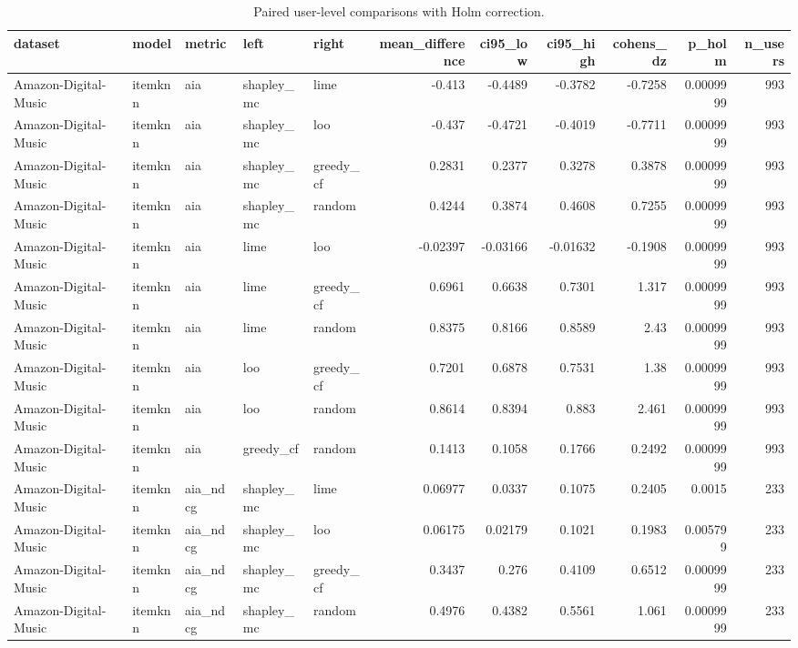 \begin{table}[t]\centering
\caption{Paired user-level comparisons with Holm correction.}\label{tab:paired-tests}
\begin{tabular}{lllllrrrrrr}
\toprule
dataset & model & metric & left & right & mean\_difference & ci95\_low & ci95\_high & cohens\_dz & p\_holm & n\_users \\
\midrule
Amazon-Digital-Music & itemknn & aia & shapley\_mc & lime & -0.413 & -0.4489 & -0.3782 & -0.7258 & 0.0009999 & 993 \\
Amazon-Digital-Music & itemknn & aia & shapley\_mc & loo & -0.437 & -0.4721 & -0.4019 & -0.7711 & 0.0009999 & 993 \\
Amazon-Digital-Music & itemknn & aia & shapley\_mc & greedy\_cf & 0.2831 & 0.2377 & 0.3278 & 0.3878 & 0.0009999 & 993 \\
Amazon-Digital-Music & itemknn & aia & shapley\_mc & random & 0.4244 & 0.3874 & 0.4608 & 0.7255 & 0.0009999 & 993 \\
Amazon-Digital-Music & itemknn & aia & lime & loo & -0.02397 & -0.03166 & -0.01632 & -0.1908 & 0.0009999 & 993 \\
Amazon-Digital-Music & itemknn & aia & lime & greedy\_cf & 0.6961 & 0.6638 & 0.7301 & 1.317 & 0.0009999 & 993 \\
Amazon-Digital-Music & itemknn & aia & lime & random & 0.8375 & 0.8166 & 0.8589 & 2.43 & 0.0009999 & 993 \\
Amazon-Digital-Music & itemknn & aia & loo & greedy\_cf & 0.7201 & 0.6878 & 0.7531 & 1.38 & 0.0009999 & 993 \\
Amazon-Digital-Music & itemknn & aia & loo & random & 0.8614 & 0.8394 & 0.883 & 2.461 & 0.0009999 & 993 \\
Amazon-Digital-Music & itemknn & aia & greedy\_cf & random & 0.1413 & 0.1058 & 0.1766 & 0.2492 & 0.0009999 & 993 \\
Amazon-Digital-Music & itemknn & aia\_ndcg & shapley\_mc & lime & 0.06977 & 0.0337 & 0.1075 & 0.2405 & 0.0015 & 233 \\
Amazon-Digital-Music & itemknn & aia\_ndcg & shapley\_mc & loo & 0.06175 & 0.02179 & 0.1021 & 0.1983 & 0.005799 & 233 \\
Amazon-Digital-Music & itemknn & aia\_ndcg & shapley\_mc & greedy\_cf & 0.3437 & 0.276 & 0.4109 & 0.6512 & 0.0009999 & 233 \\
Amazon-Digital-Music & itemknn & aia\_ndcg & shapley\_mc & random & 0.4976 & 0.4382 & 0.5561 & 1.061 & 0.0009999 & 233 \\

\end{tabular}
\end{table}
